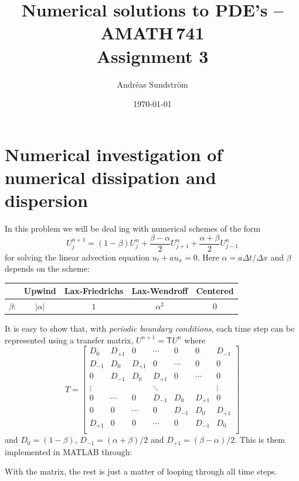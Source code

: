 \documentclass[11pt,letter, swedish, english
]{article}
\newcommand{\Dx}{\ensuremath{\Delta{x}}}
\newcommand{\Dt}{\ensuremath{\Delta{t}}}
\begin{document}

\title{Numerical solutions to PDE's -- AMATH\,741 \\
Assignment 3}
\author{Andréas Sundström}
\date{\today}

\maketitle


\section{Numerical investigation of numerical dissipation and dispersion}
In this problem we will be deal ing with numerical schemes of the form
\begin{equation}
U_j^{n+1}=(1-\beta)U_j^n+\frac{\beta-\alpha}{2}U_{j+1}^n+\frac{\alpha+\beta}{2}U_{j-1}^n
\end{equation}
for solving the linear advection equation $u_t+au_x=0$. Here
$\alpha=a\Dt/\Dx$ and $\beta$ depends on the scheme:
\begin{center}
\begin{tabular}{l|c|c|c|c|}\cline{2-5}
&Upwind&Lax-Friedrichs&Lax-Wendroff&Centered\\ \hline
\multicolumn{1}{|l|}{$\beta$: }&$|\alpha|$&$1$&$\alpha^2$&0\\ \hline
\end{tabular}
\end{center}

It is easy to show that, with \emph{periodic boundary conditions},
each time step can be represented using a transfer matrix,
$U^{n+1}=\mathsf{T}U^n$ where
\begin{equation}
T=\begin{bmatrix}
D_0&D_{+1}&0&\cdots&0&0&D_{-1}\\
D_{-1}&D_0&D_{+1}&0&\cdots&0&0\\
0&D_{-1}&D_0&D_{+1}&0&\cdots&0\\
\vdots&&&\ddots&&&\vdots\\
0&\cdots&0&D_{-1}&D_0&D_{+1}&0\\
0&0&\cdots&0&D_{-1}&D_0&D_{+1}\\
D_{+1}&0&0&\cdots&0&D_{-1}&D_0\\
\end{bmatrix}
\end{equation}
and $D_0=(1-\beta)$, $D_{-1}=(\alpha+\beta)/2$ and
$D_{+1}=(\beta-\alpha)/2$. 
This is them implemented in MATLAB through:

With the matrix, the rest is just a matter of looping through all time
steps.  
\end{document}
